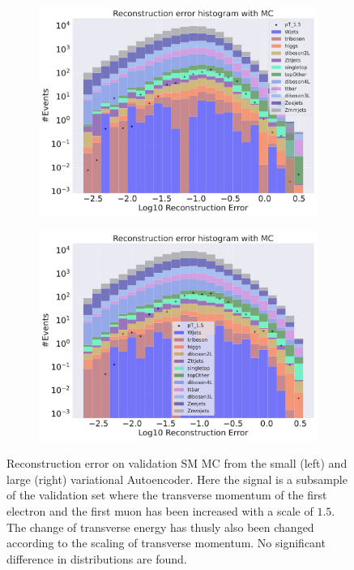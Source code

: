 \begin{figure}[h!]
    \centering
    \begin{subfigure}{.45\textwidth}
        \includegraphics[width=\textwidth]{Figures/VAE_testing/small/b_data_recon_big_rm3_feats_sig_pT_1.5.pdf}
        \caption{}
        \label{fig:VAE_small_pt_1_5}
    \end{subfigure}
    \hfill 
    \begin{subfigure}{.45\textwidth}
        \includegraphics[width=\textwidth]{Figures/VAE_testing/big/b_data_recon_big_rm3_feats_sig_pT_1.5.pdf}
        \caption{ }
        \label{fig:VAE_big_pt_1_5}
    \end{subfigure}
    \hfill 
    \caption[VAE |Reconstruction error $p_T$ altering of 1.5]{Reconstruction error on validation SM MC from the small (left) and large (right) variational Autoencoder. Here the signal is a subsample of the validation 
    set where the transverse momentum of the first electron and the first muon has been increased with a scale of $1.5$. The change of transverse 
    energy has thusly also been changed according to the scaling of transverse momentum. No significant difference in distributions are found. }
    \label{fig:VAE_big_small_pt_1_5}
\end{figure}

